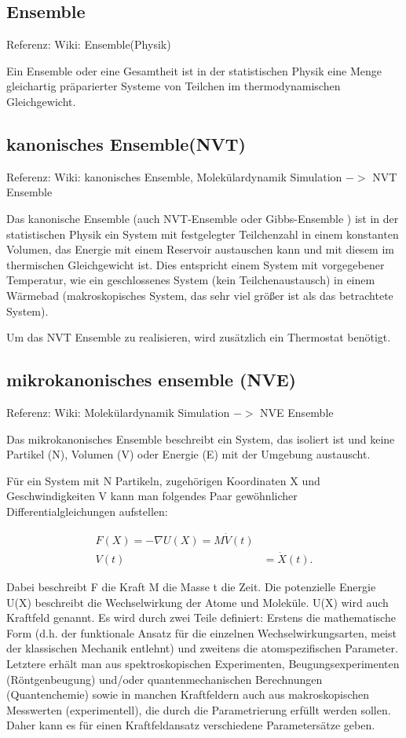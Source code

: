 \documentclass[]{article}
\begin{document}
\subsection{Ensemble}
Referenz: Wiki: Ensemble(Physik) 

Ein Ensemble oder eine Gesamtheit ist in der statistischen Physik eine Menge gleichartig präparierter Systeme von Teilchen im thermodynamischen Gleichgewicht. 

\subsection{kanonisches Ensemble(NVT)}
Referenz: Wiki: kanonisches Ensemble,  Molekülardynamik Simulation $->$ NVT Ensemble

Das kanonische Ensemble (auch NVT-Ensemble oder Gibbs-Ensemble ) ist in der statistischen Physik ein System mit festgelegter Teilchenzahl in einem konstanten Volumen, das Energie mit einem Reservoir austauschen kann und mit diesem im thermischen Gleichgewicht ist. Dies entspricht einem System mit vorgegebener Temperatur, wie ein geschlossenes System (kein Teilchenaustausch) in einem Wärmebad (makroskopisches System, das sehr viel größer ist als das betrachtete System).

Um das NVT Ensemble zu realisieren, wird zusätzlich ein Thermostat benötigt. 

\subsection{mikrokanonisches ensemble (NVE)}
Referenz: Wiki: Molekülardynamik Simulation $->$ NVE Ensemble

Das mikrokanonisches Ensemble beschreibt ein System, das isoliert ist und keine Partikel (N), Volumen (V) oder Energie (E) mit der Umgebung austauscht.

Für ein System mit N Partikeln, zugehörigen Koordinaten X und Geschwindigkeiten V kann man folgendes Paar gewöhnlicher Differentialgleichungen aufstellen:

\begin{align} F(X) = - \nabla U(X) = M \dot{V}(t) &\\ V(t) & = \dot{X}(t). \end{align}

Dabei beschreibt F die Kraft M die Masse
t die Zeit. Die potenzielle Energie U(X) beschreibt die Wechselwirkung der Atome und Moleküle. U(X) wird auch Kraftfeld genannt. Es wird durch zwei Teile definiert:
Erstens die mathematische Form (d.h. der funktionale Ansatz für die einzelnen Wechselwirkungsarten, meist der klassischen Mechanik entlehnt) und zweitens die atomspezifischen Parameter. Letztere erhält man aus spektroskopischen Experimenten, Beugungsexperimenten (Röntgenbeugung) und/oder quantenmechanischen Berechnungen (Quantenchemie) sowie in manchen Kraftfeldern auch aus makroskopischen Messwerten (experimentell), die durch die Parametrierung erfüllt werden sollen. Daher kann es für einen Kraftfeldansatz verschiedene Parametersätze geben.
\end{document}
